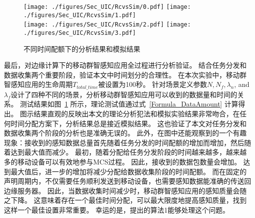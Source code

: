 
\begin{figure}[!h]
  \centering
  {\texttt{[image: ./figures/Sec\_UIC/RcvsSim/0.pdf]}}
  {\texttt{[image: ./figures/Sec\_UIC/RcvsSim/1.pdf]}}\\
  {\texttt{[image: ./figures/Sec\_UIC/RcvsSim/2.pdf]}}
  {\texttt{[image: ./figures/Sec\_UIC/RcvsSim/3.pdf]}}
  \vspace{-1em}
  \caption{不同时间配额下的分析结果和模拟结果}
  \label{Figure_EntireTest}
\end{figure}

最后，对边缘计算下的移动群智感知应用全过程进行分析验证。
结合任务分发和数据收集两个重要阶段，验证本文中时间划分的合理性。
在本次实验中，移动群智感知应用的生命周期$T_{total\_time}$被设置为100秒。
针对场景定义参数$N, N_f, \lambda_n$, and $\lambda_f$设计了四种不同的场景，分析移动群智感知应用可以收到的数据量和时间的关系。
测试结果如图~\ref{Figure_EntireTest} 所示，理论测试值通过式~\eqref{Formula_DataAmount} 计算得出。
图示结果直观的反映出本文的理论分析犯法和模拟实验结果非常吻合，在任何时间分配方案下，分析结果总是接近模拟结果。
这也验证了本文对任务分发和数据收集两个阶段的分析也是准确无误的。
此外，在图中还能观察到的一个有趣现象：接收到的感知数据总量首先随着任务分发的时间配额的增加而增加，然后随着达到最大值而减少。
最初，随着分配给任务分发阶段的时间越来越多，越来越多的移动设备可以有效地参与MCS过程。
因此，接收到的数据包数量会增加。
达到最大值后，进一步的增加将减少分配给数据收集阶段的时间配额。
而在固定的声明周期内，不仅需要任务顺利发送到移动设备，也需要感知数据能准确的传送回边缘服务器。
因此，当数据收集时间减少时，移动群智感知应用的感知质量会随之下降。
这意味着存在一个最佳时间分配，可以最大限度地提高感知质量，找到这样一个最佳设置非常重要。
幸运的是，提出的算法1能够处理这个问题。

